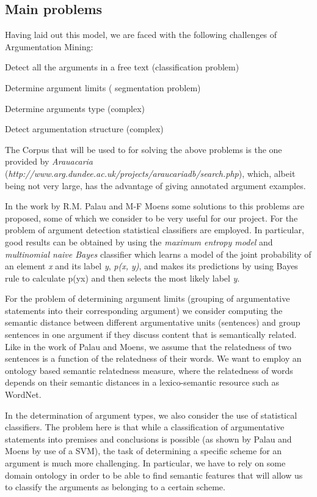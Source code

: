 \subsection{Main problems}
\par
Having laid out this model, we are faced with the following challenges of Argumentation Mining: 
\begin{description}
\item Detect all the arguments in a free text (classification problem)
\item Determine argument limits ( segmentation problem)
\item Determine arguments type (complex)
\item Detect argumentation structure (complex)
\end{description}
\par
The Corpus that will be used to for solving the above problems is the one provided by \textit{Arauacaria} (\textit {http://www.arg.dundee.ac.uk/projects/araucariadb/search.php}), which, albeit being not very large, has the advantage of giving annotated argument examples.
\par
In the work by R.M. Palau and M-F Moens\cite{palau1} some solutions to this problems are proposed, some of which we consider to be very useful for our project. For the problem of argument detection statistical classifiers are employed. In particular, good results can be obtained by using the \textit{maximum entropy model} and \textit{multinomial naive Bayes} classifier which learns a model of the joint probability of an element \textit{x} and its label \textit{y}, \textit{p(x, y)}, and makes its predictions by using Bayes rule to calculate p(y\textbar x) and then selects the most likely label \textit{y}.
\par
For the problem of determining argument limits (grouping of argumentative statements into their corresponding argument) we consider computing the semantic distance between different argumentative units (sentences) and group sentences in one argument if they discuss content that is semantically related. Like in the work of Palau and Moens, we assume that the relatedness of two sentences is a function of the relatedness of their words. We want to employ an ontology based semantic relatedness measure, where the relatedness of words depends on their semantic distances in a lexico-semantic resource such as WordNet.
\par
In the determination of argument types, we also consider the use of statistical classifiers.
The problem here is that while a classification of argumentative statements into premises and conclusions is possible (as shown by Palau and Moens by use of a SVM), the task of determining a specific scheme for an argument is much more challenging. In particular, we have to rely on some domain ontology in order to be able to find semantic features that will allow us to classify the arguments as belonging to a certain scheme.

